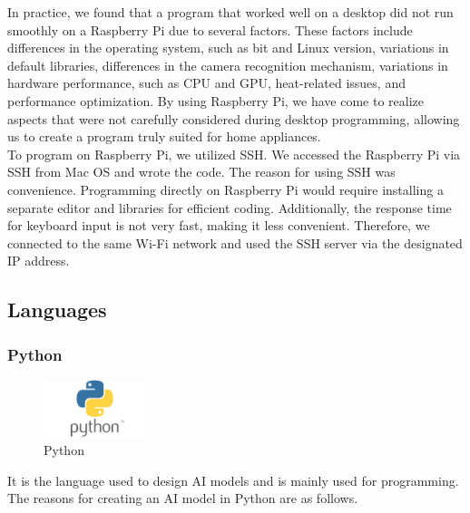 In practice, we found that a program that worked well on a desktop did not run smoothly on a Raspberry Pi due to several factors. These factors include differences in the operating system, such as bit and Linux version, variations in default libraries, differences in the camera recognition mechanism, variations in hardware performance, such as CPU and GPU, heat-related issues, and performance optimization. By using Raspberry Pi, we have come to realize aspects that were not carefully considered during desktop programming, allowing us to create a program truly suited for home appliances.\\

To program on Raspberry Pi, we utilized SSH. We accessed the Raspberry Pi via SSH from Mac OS and wrote the code. The reason for using SSH was convenience. Programming directly on Raspberry Pi would require installing a separate editor and libraries for efficient coding. Additionally, the response time for keyboard input is not very fast, making it less convenient. Therefore, we connected to the same Wi-Fi network and used the SSH server via the designated IP address.\\

\subsection{\textbf{Languages}}
\subsubsection{\textbf{Python}}

\begin{figure}[htp]
\centering
\includegraphics[width=3cm]{images/python.png}
\caption{Python}
\label{fig:python}
\end{figure}
    
It is the language used to design AI models and is mainly used for programming. The reasons for creating an AI model in Python are as follows.
\\

